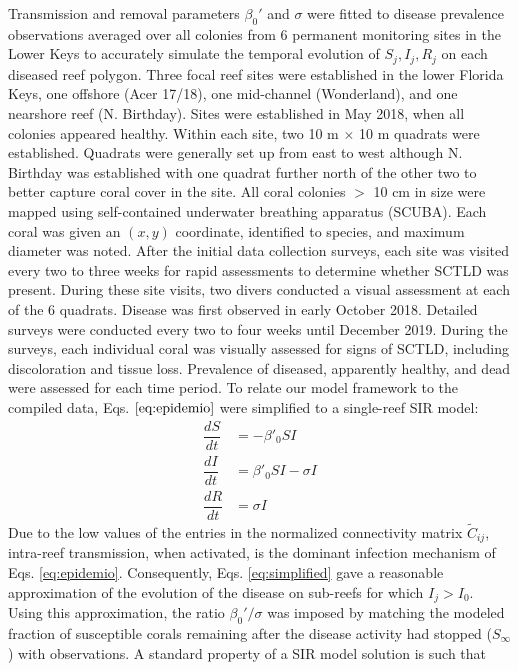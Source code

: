 \documentclass[utf8]{frontiersSCNS}
\begin{document}
Transmission and removal parameters $\beta_0'$ and $\sigma$ were fitted to disease prevalence observations averaged over all colonies from 6 permanent monitoring sites in the Lower Keys to accurately simulate the temporal evolution of $S_j,I_j,R_j$ on each diseased reef polygon. Three focal reef sites were established in the lower Florida Keys, one offshore (Acer 17/18), one mid-channel (Wonderland), and one nearshore reef (N. Birthday). Sites were established in May 2018, when all colonies appeared healthy. Within each site, two 10 m $\times$ 10 m quadrats were established. Quadrats were generally set up from east to west although N. Birthday was established with one quadrat further north of the other two to better capture coral cover in the site. All coral colonies $>$ 10 cm in size were mapped using self-contained underwater breathing apparatus (SCUBA). Each coral was given an $(x,y)$ coordinate, identified to species, and maximum diameter was noted. After the initial data collection surveys, each site was visited every two to three weeks for rapid assessments to determine whether SCTLD was present. During these site visits, two divers conducted a visual assessment at each of the 6 quadrats. Disease was first observed in early October 2018. Detailed surveys were conducted every two to four weeks until December 2019. During the surveys, each individual coral was visually assessed for signs of SCTLD, including discoloration and tissue loss. Prevalence of diseased, apparently healthy, and dead were assessed for each time period. To relate our model framework to the compiled data, Eqs. $\ref{eq:epidemio}$ were simplified to a single-reef SIR model:
\begin{equation}
    \begin{aligned}
        \dfrac{dS}{dt} &= -\beta'_0SI \\
        \dfrac{dI}{dt} &= \beta'_0SI - \sigma I \\
        \dfrac{dR}{dt} &= \sigma I
    \end{aligned}\label{eq:simplified}
\end{equation}
Due to the low values of the entries in the normalized connectivity matrix $\tilde{C}_{ij}$, intra-reef transmission, when activated, is the dominant infection mechanism of Eqs. \ref{eq:epidemio}. Consequently, Eqs. \ref{eq:simplified} gave a reasonable approximation of the evolution of the disease on sub-reefs for which $I_j > I_0$. Using this approximation, the ratio $\beta_0'/\sigma$ was imposed by matching the modeled fraction of susceptible corals remaining after the disease activity had stopped ($S_\infty$) with observations. A standard property of a SIR model solution is such that
\end{document}

